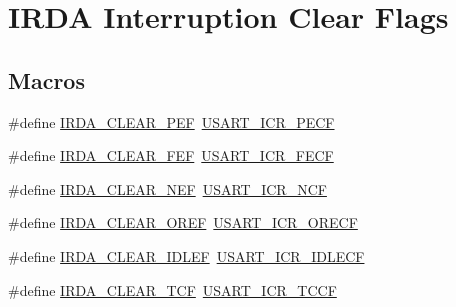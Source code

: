 \hypertarget{group___i_r_d_a___i_t___c_l_e_a_r___flags}{}\section{I\+R\+DA Interruption Clear Flags}
\label{group___i_r_d_a___i_t___c_l_e_a_r___flags}
\subsection*{Macros}
\begin{DoxyCompactItemize}
\item 
\#define \hyperlink{group___i_r_d_a___i_t___c_l_e_a_r___flags_ga1ad61cf6ce6e169e1b7cd9934818bb71}{I\+R\+D\+A\+\_\+\+C\+L\+E\+A\+R\+\_\+\+P\+EF}~\hyperlink{group___peripheral___registers___bits___definition_ga404185136eb68f679e82e0187d66e411}{U\+S\+A\+R\+T\+\_\+\+I\+C\+R\+\_\+\+P\+E\+CF}
\item 
\#define \hyperlink{group___i_r_d_a___i_t___c_l_e_a_r___flags_ga8974fb094f7e7c623ba81aea05de2543}{I\+R\+D\+A\+\_\+\+C\+L\+E\+A\+R\+\_\+\+F\+EF}~\hyperlink{group___peripheral___registers___bits___definition_ga8400b4500c41800e5f18fc7291a64c9f}{U\+S\+A\+R\+T\+\_\+\+I\+C\+R\+\_\+\+F\+E\+CF}
\item 
\#define \hyperlink{group___i_r_d_a___i_t___c_l_e_a_r___flags_gab2fec5f35837bc513cb9fa958f482a4f}{I\+R\+D\+A\+\_\+\+C\+L\+E\+A\+R\+\_\+\+N\+EF}~\hyperlink{group___peripheral___registers___bits___definition_gad50b0d2460df1cbddd9576c2f4637312}{U\+S\+A\+R\+T\+\_\+\+I\+C\+R\+\_\+\+N\+CF}
\item 
\#define \hyperlink{group___i_r_d_a___i_t___c_l_e_a_r___flags_gaef356fb07cf820843d8863ee30212a78}{I\+R\+D\+A\+\_\+\+C\+L\+E\+A\+R\+\_\+\+O\+R\+EF}~\hyperlink{group___peripheral___registers___bits___definition_ga375f76b0670ffeb5d2691592d9e7c422}{U\+S\+A\+R\+T\+\_\+\+I\+C\+R\+\_\+\+O\+R\+E\+CF}
\item 
\#define \hyperlink{group___i_r_d_a___i_t___c_l_e_a_r___flags_ga25e9b5108318d697e308bdc09d1d5597}{I\+R\+D\+A\+\_\+\+C\+L\+E\+A\+R\+\_\+\+I\+D\+L\+EF}~\hyperlink{group___peripheral___registers___bits___definition_ga9d4d7675c0d36ce4347c3509d27c0760}{U\+S\+A\+R\+T\+\_\+\+I\+C\+R\+\_\+\+I\+D\+L\+E\+CF}
\item 
\#define \hyperlink{group___i_r_d_a___i_t___c_l_e_a_r___flags_ga90c7c32218dc7e62b918168b147ae268}{I\+R\+D\+A\+\_\+\+C\+L\+E\+A\+R\+\_\+\+T\+CF}~\hyperlink{group___peripheral___registers___bits___definition_gacf92ea54425a962dde662b10b61d0250}{U\+S\+A\+R\+T\+\_\+\+I\+C\+R\+\_\+\+T\+C\+CF}
\end{DoxyCompactItemize}


